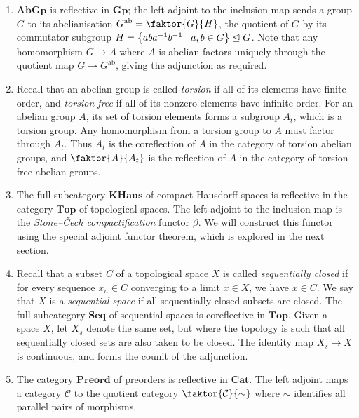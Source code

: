 \begin{example}
    \begin{enumerate}
        \item \( \mathbf{AbGp} \) is reflective in \( \mathbf{Gp} \); the left adjoint to the inclusion map sends a group \( G \) to its abelianisation \( G^{\mathrm{ab}} = \faktor{G}{H} \), the quotient of \( G \) by its commutator subgroup \( H = \qty{aba^{-1}b^{-1} \mid a, b \in G} \trianglelefteq G \).
        Note that any homomorphism \( G \to A \) where \( A \) is abelian factors uniquely through the quotient map \( G \to G^{\mathrm{ab}} \), giving the adjunction as required.
        \item Recall that an abelian group is called \emph{torsion} if all of its elements have finite order, and \emph{torsion-free} if all of its nonzero elements have infinite order.
        For an abelian group \( A \), its set of torsion elements forms a subgroup \( A_t \), which is a torsion group.
        Any homomorphism from a torsion group to \( A \) must factor through \( A_t \).
        Thus \( A_t \) is the coreflection of \( A \) in the category of torsion abelian groups, and \( \faktor{A}{A_t} \) is the reflection of \( A \) in the category of torsion-free abelian groups.
        \item The full subcategory \( \mathbf{KHaus} \) of compact Hausdorff spaces is reflective in the category \( \mathbf{Top} \) of topological spaces.
        The left adjoint to the inclusion map is the \emph{Stone--\v{C}ech compactification} functor \( \beta \).
        We will construct this functor using the special adjoint functor theorem, which is explored in the next section.
        \item Recall that a subset \( C \) of a topological space \( X \) is called \emph{sequentially closed} if for every sequence \( x_n \in C \) converging to a limit \( x \in X \), we have \( x \in C \).
        We say that \( X \) is a \emph{sequential space} if all sequentially closed subsets are closed.
        The full subcategory \( \mathbf{Seq} \) of sequential spaces is coreflective in \( \mathbf{Top} \).
        Given a space \( X \), let \( X_s \) denote the same set, but where the topology is such that all sequentially closed sets are also taken to be closed.
        The identity map \( X_s \to X \) is continuous, and forms the counit of the adjunction.
        \item The category \( \mathbf{Preord} \) of preorders is reflective in \( \mathbf{Cat} \).
        The left adjoint maps a category \( \mathcal C \) to the quotient category \( \faktor{\mathcal C}{\sim} \) where \( \sim \) identifies all parallel pairs of morphisms.

\end{enumerate}
\end{example}
